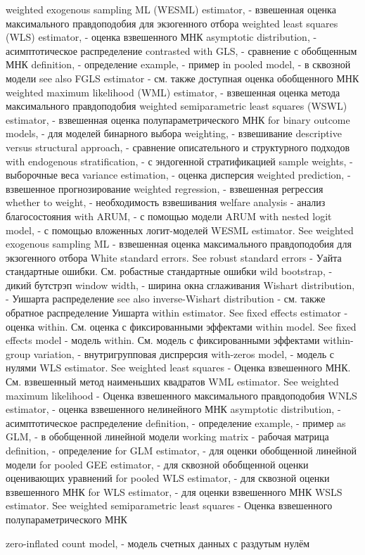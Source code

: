 weighted exogenous sampling ML (WESML) estimator, - взвешенная оценка максимального правдоподобия для экзогенного отбора
weighted least squares (WLS) estimator, - оценка взвешенного МНК
asymptotic distribution, - асимптотическое распределение
contrasted with GLS, - сравнение с обобщенным МНК
definition, - определение
example, - пример
in pooled model, - в сквозной модели
see also FGLS estimator - см. также доступная оценка обобщенного МНК
weighted maximum likelihood (WML) estimator, - взвешенная оценка метода максимального правдоподобия
weighted semiparametric least squares (WSWL) estimator, - взвешенная оценка полупараметрического МНК
for binary outcome models, - для моделей бинарного выбора
weighting, - взвешивание
descriptive versus structural approach, - сравнение описательного и структурного подходов
with endogenous stratification, - с эндогенной стратификацией
sample weights, - выборочные веса
variance estimation, - оценка дисперсия
weighted prediction, - взвешенное прогнозирование
weighted regression, - взвешенная регрессия
whether to weight, - необходимость взвешивания
welfare analysis - анализ благосостояния
with ARUM, - с помощью модели ARUM
with nested logit model, - с помощью вложенных логит-моделей
WESML estimator. See weighted exogenous sampling ML - взвешенная оценка максимального правдоподобия для экзогенного отбора
White standard errors. See robust standard errors - Уайта стандартные ошибки. См. робастные стандартные ошибки
wild bootstrap, - дикий бутстрэп
window width, - ширина окна сглаживания
Wishart distribution, - Уишарта распределение
see also inverse-Wishart distribution - см. также обратное распределение Уишарта
within estimator. See fixed effects estimator - оценка within. См. оценка с фиксированными эффектами
within model. See fixed effects model - модель within. См. модель с фиксированными эффектами
within-group variation, - внутригрупповая диспрерсия
with-zeros model, - модель с нулями
WLS estimator. See weighted least squares - Оценка взвешенного МНК. См. взвешенный метод наименьших квадратов
WML estimator. See weighted maximum likelihood - Оценка взвешенного максимального правдоподобия
WNLS estimator, - оценка взвешенного нелинейного МНК
asymptotic distribution, - асимптотическое распределение
definition, - определение
example, - пример
as GLM, - в обобщенной линейной модели
working matrix - рабочая матрица
definition, - определение
for GLM estimator, - для оценки обобщенной линейной модели
for pooled GEE estimator, - для сквозной обобщенной оценки оценивающих уравнений
for pooled WLS estimator, - для сквозной оценки взвешенного МНК
for WLS estimator, - для оценки взвешенного МНК
WSLS estimator. See weighted semiparametric least squares - Оценка взвешенного полупараметрического МНК

zero-inflated count model, - модель счетных данных с раздутым нулём
